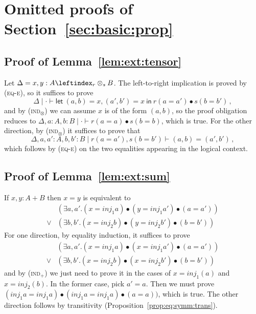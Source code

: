 \documentclass[a4paper,UKenglish,cleveref, autoref, thm-restate]{lipics-v2021}
\newcommand{\giorgio}[1]{{\color{red}\textbf{GB:}~#1}}  %
\newcommand{\mprod}{\otimes}
\newcommand{\pair}[2]{\otimes_{#1,#2}}
\renewcommand{\pair}[2]{\leftindex_{#1}\otimes_{#2}} %
\newcommand{\inj}{\mathsf{\mathit{inj}}}
\newcommand{\scaling}{}
\newcommand{\letIn}[2]{\mathsf{let~} #1 \mathsf{~in~} #2}
\newcommand{\ltensor}{*}
\renewcommand{\ltensor}{\bullet}
\newcommand{\logicJ}[3][\Delta]{#1 \mid #2 \vdash #3}
\newcommand{\peq}{=}
\begin{document}
\section{Omitted proofs of Section~\ref{sec:basic:prop}}


\subsection*{Proof of Lemma~\ref{lem:ext:tensor}}
 Let $\Delta = x,y : A \pair{r}{s} B$. The left-to-right implication is proved by (\textsc{eq-e}), so it suffices to prove 
 \[\logicJ[\Delta]{\cdot}{\letIn{(a,b) = x, (a',b') = x}{r\scaling(a\peq a') \ltensor s (b \peq b')} } \,, \]
 and by (\textsc{ind${}_\mprod$}) we can assume $x$ is of the form $(a,b)$, so the proof obligation reduces to
 $\logicJ[\Delta, a:A, b:B]{\cdot}{r\scaling(a\peq a) \ltensor s (b \peq b)}$, 
 which is true. For the other direction, by (\textsc{ind${}_\mprod$}) it suffices to prove that 
\[ \logicJ[\Delta, a,a':A, b,b':B]{r\scaling(a\peq a') , s (b \peq b')}{(a,b) \peq (a',b')} \,,\]
which follows by (\textsc{eq-e}) on the two equalities appearing in the logical context.


\subsection*{Proof of Lemma~\ref{lem:ext:sum}}
 If $x,y : A + B$ then $x \peq y$ is equivalent to 
\begin{align*}
& (\exists a,a'. (x \peq \inj_1 a) \ltensor (y \peq \inj_1 a') \ltensor (a \peq a')) \\
\vee & 
 (\exists b,b'. (x \peq \inj_2 b) \ltensor (y \peq \inj_2 b') \ltensor (b \peq b'))
\end{align*}
 For one direction, by equality induction, it suffices to prove 
\begin{align*}
& (\exists a,a'. (x \peq \inj_1 a) \ltensor (x \peq \inj_1 a') \ltensor (a \peq a')) \\
\vee & 
 (\exists b,b'. (x \peq \inj_2 b) \ltensor (x \peq \inj_2 b') \ltensor (b \peq b'))
\end{align*}
and by (\textsc{ind${}_+$}) we just need to prove it in the cases of $x = \inj_1(a)$ and $x = \inj_2(b)$. In the former case,
pick $a'=a$. Then we must prove $(\inj_1 a \peq \inj_1 a) \ltensor (\inj_1 a \peq \inj_1 a) \ltensor (a \peq a))$,
which is true. The other direction follows by transitivity (Proposition~\ref{prop:eq:symm:trans}).
\end{document}
